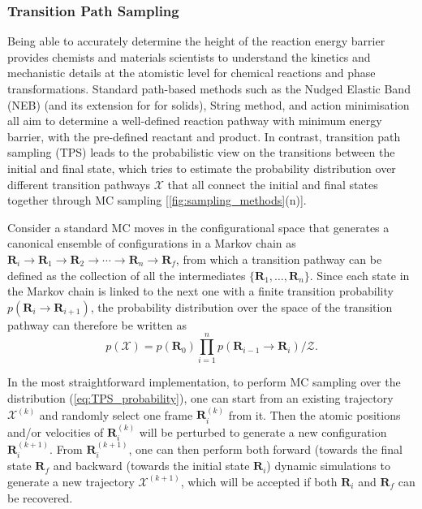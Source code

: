 \subsubsection{Transition Path Sampling}
Being able to accurately determine the height of the reaction energy barrier provides chemists and materials scientists to understand the kinetics and mechanistic details at the atomistic level for chemical reactions and phase transformations. Standard path-based methods such as the Nudged Elastic Band (NEB)\cite{jonsson1998nudged} (and its extension for for solids\cite{sheppard2012generalized}), String method,\cite{weinan2002string} and action minimisation\cite{passerone2001action} all aim to determine a well-defined reaction pathway with minimum energy barrier, with the pre-defined reactant and product. In contrast, transition path sampling (TPS)\cite{bolhuis2021transition} leads to the probabilistic view on the transitions between the initial and final state, which tries to estimate the probability distribution over different transition pathways $\mathcal{X}$ that all connect the initial and final states together through MC sampling [\cref{fig:sampling_methods}(n)]. 

Consider a standard MC moves in the configurational space that generates a canonical ensemble of configurations in a Markov chain as $\bm{R}_{i}\to\bm{R}_1\to\bm{R}_2\to\cdots\to\bm{R}_{n}\to\bm{R}_f$, from which a transition pathway can be defined as the collection of all the intermediates $\{\bm{R}_1,\ldots,\bm{R}_n\}$. Since each state in the Markov chain is linked to the next one with a finite transition  probability $p(\bm{R}_i\to\bm{R}_{i+1})$, the probability distribution over the  space of the transition pathway can therefore be written as 
\begin{equation}
    \label{eq:TPS_probability}
    p(\mathcal{X})=p(\bm{R}_0)\prod_{i=1}^{n}p(\bm{R}_{i-1}\to\bm{R}_i)/\mathcal{Z}.
\end{equation}

In the most straightforward implementation, to perform MC sampling over the distribution (\ref{eq:TPS_probability}), one can start from an existing trajectory $\mathcal{X}^{(k)}$ and randomly select one frame $\bm{R}_i^{(k)}$ from it. Then the atomic positions and/or velocities of $\bm{R}_i^{(k)}$ will be perturbed to generate a new configuration $\bm{R}_i^{(k+1)}$. From $\bm{R}_i^{(k+1)}$, one can then perform both forward (towards the final state $\bm{R}_f$ and backward (towards the initial state $\bm{R}_i$) dynamic simulations to generate a new trajectory $\mathcal{X}^{(k+1)}$, which will be accepted if both $\bm{R}_i$ and $\bm{R}_f$ can be recovered. 

